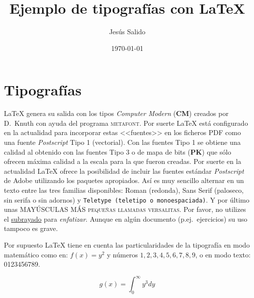 \documentclass[11pt,a4paper]{article}
\title{Ejemplo de tipografías con \LaTeX}
\author{Jesús Salido}
\date{\today}
\begin{document}
\maketitle


\section{Tipografías}
\LaTeX{} genera su salida con los tipos \emph{Computer Modern} (\textbf{CM}) creados por D.~Knuth con ayuda del programa \textsc{metafont}. Por suerte \LaTeX{} está configurado en la actualidad para incorporar estas <<fuentes>> en los ficheros PDF como una fuente \emph{Postscript} Tipo 1 (vectorial). Con las fuentes Tipo 1 se obtiene una calidad al obtenido con las fuentes Tipo 3 o de mapa de bits (\textbf{PK}) que sólo ofrecen máxima calidad a la escala para la que fueron creadas. Por suerte en la actualidad \LaTeX{} ofrece la posibilidad de incluir las fuentes estándar \emph{Postscript} de \textsf{Adobe} utilizando los paquetes apropiados. Así es muy sencillo alternar en un texto entre las tres familias disponibles: Roman (redonda), \textsf{Sans Serif (paloseco, sin serifa o sin adornos)} y \texttt{Teletype (teletipo o monoespaciada)}. Y por último unas MAYÚSCULAS MÁS \textsc{pequeñas llamadas versalitas}. Por favor, no utilizes el \underline{subrayado} para \emph{enfatizar}. Aunque en algún documento (p.ej.\ ejercicios) su uso tampoco es grave.

Por supuesto \LaTeX{} tiene en cuenta las particularidades de la tipografía en modo matemático como en: $f(x)=y^2$ y números $1,2,3,4,5,6,7,8,9$, o en modo texto: 0123456789.

$$g(x)=\int_{0}^{\infty}y^{3}dy$$
\end{document}
